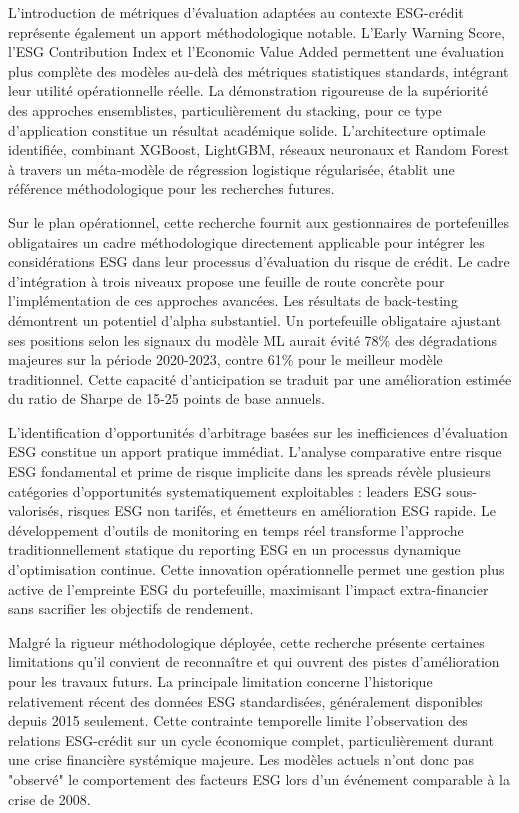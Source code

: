 L'introduction de métriques d'évaluation adaptées au contexte ESG-crédit représente également un apport méthodologique notable. L'Early Warning Score, l'ESG Contribution Index et l'Economic Value Added permettent une évaluation plus complète des modèles au-delà des métriques statistiques standards, intégrant leur utilité opérationnelle réelle. La démonstration rigoureuse de la supériorité des approches ensemblistes, particulièrement du stacking, pour ce type d'application constitue un résultat académique solide. L'architecture optimale identifiée, combinant XGBoost, LightGBM, réseaux neuronaux et Random Forest à travers un méta-modèle de régression logistique régularisée, établit une référence méthodologique pour les recherches futures.

Sur le plan opérationnel, cette recherche fournit aux gestionnaires de portefeuilles obligataires un cadre méthodologique directement applicable pour intégrer les considérations ESG dans leur processus d'évaluation du risque de crédit. Le cadre d'intégration à trois niveaux propose une feuille de route concrète pour l'implémentation de ces approches avancées. Les résultats de back-testing démontrent un potentiel d'alpha substantiel. Un portefeuille obligataire ajustant ses positions selon les signaux du modèle ML aurait évité 78\% des dégradations majeures sur la période 2020-2023, contre 61\% pour le meilleur modèle traditionnel. Cette capacité d'anticipation se traduit par une amélioration estimée du ratio de Sharpe de 15-25 points de base annuels.

L'identification d'opportunités d'arbitrage basées sur les inefficiences d'évaluation ESG constitue un apport pratique immédiat. L'analyse comparative entre risque ESG fondamental et prime de risque implicite dans les spreads révèle plusieurs catégories d'opportunités systematiquement exploitables : leaders ESG sous-valorisés, risques ESG non tarifés, et émetteurs en amélioration ESG rapide. Le développement d'outils de monitoring en temps réel transforme l'approche traditionnellement statique du reporting ESG en un processus dynamique d'optimisation continue. Cette innovation opérationnelle permet une gestion plus active de l'empreinte ESG du portefeuille, maximisant l'impact extra-financier sans sacrifier les objectifs de rendement.

Malgré la rigueur méthodologique déployée, cette recherche présente certaines limitations qu'il convient de reconnaître et qui ouvrent des pistes d'amélioration pour les travaux futurs. La principale limitation concerne l'historique relativement récent des données ESG standardisées, généralement disponibles depuis 2015 seulement. Cette contrainte temporelle limite l'observation des relations ESG-crédit sur un cycle économique complet, particulièrement durant une crise financière systémique majeure. Les modèles actuels n'ont donc pas "observé" le comportement des facteurs ESG lors d'un événement comparable à la crise de 2008.

